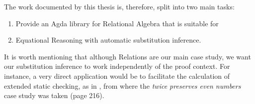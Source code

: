 The work documented by this thesis is, therefore, split into two main tasks:
\begin{enumerate} %
  \item Provide an Agda library for Relational Algebra that is suitable for
  \item Equational Reasoning with automatic substitution inference.
\end{enumerate}

It is worth mentioning that although Relations are our main case study, we want
our substitution inference to work independently of the proof context. For instance,
a very direct application would be to facilitate the calculation of extended static
checking, as in \cite{JNO2009}, from where the \emph{twice preserves even numbers}
case study was taken (page 216).





